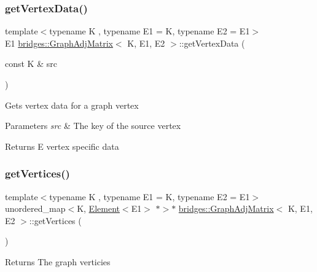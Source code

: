 \subsubsection{\texorpdfstring{get\+Vertex\+Data()}{getVertexData()}}
{\footnotesize\ttfamily template$<$typename K , typename E1  = K, typename E2  = E1$>$ \\
E1 \mbox{\hyperlink{classbridges_1_1_graph_adj_matrix}{bridges\+::\+Graph\+Adj\+Matrix}}$<$ K, E1, E2 $>$\+::get\+Vertex\+Data (\begin{DoxyParamCaption}\item[{const K \&}]{src }\end{DoxyParamCaption})\hspace{0.3cm}{\ttfamily [inline]}}

Gets vertex data for a graph vertex


\begin{DoxyParams}{Parameters}
{\em src} & The key of the source vertex\\
\hline
\end{DoxyParams}
\begin{DoxyReturn}{Returns}
E vertex specific data 
\end{DoxyReturn}
\mbox{\label{classbridges_1_1_graph_adj_matrix_a83f79301ef6807c2a40f288c808f758b}} 
\subsubsection{\texorpdfstring{get\+Vertices()}{getVertices()}}
{\footnotesize\ttfamily template$<$typename K , typename E1  = K, typename E2  = E1$>$ \\
unordered\+\_\+map$<$K, \mbox{\hyperlink{classbridges_1_1_element}{Element}}$<$E1$>$ $\ast$$>$$\ast$ \mbox{\hyperlink{classbridges_1_1_graph_adj_matrix}{bridges\+::\+Graph\+Adj\+Matrix}}$<$ K, E1, E2 $>$\+::get\+Vertices (\begin{DoxyParamCaption}{ }\end{DoxyParamCaption})\hspace{0.3cm}{\ttfamily [inline]}}

\begin{DoxyReturn}{Returns}
The graph verticies 
\end{DoxyReturn}
\mbox{\label{classbridges_1_1_graph_adj_matrix_a895b044adb939413fc695c15415b848b}} 

